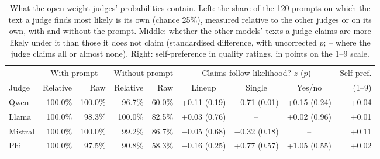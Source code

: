 \begin{table}[t]
\centering\small
\setlength\tabcolsep{4pt}
\begin{adjustbox}{max width=\linewidth}
\begin{tabular}{l rr rr ccc r}
\toprule
 & \multicolumn{2}{c}{With prompt} & \multicolumn{2}{c}{Without prompt} & \multicolumn{3}{c}{Claims follow likelihood? $z$ ($p$)} & Self-pref. \\
\cmidrule(lr){2-3}\cmidrule(lr){4-5}\cmidrule(lr){6-8}
Judge & Relative & Raw & Relative & Raw & Lineup & Single & Yes/no & (1--9) \\
\midrule
Qwen & 100.0\% & 100.0\% & 96.7\% & 60.0\% & +0.11 (0.19) & $-$0.71 (0.01) & +0.15 (0.24) & +0.04 \\
Llama & 100.0\% & 98.3\% & 100.0\% & 82.5\% & +0.03 (0.76) & -- & +0.02 (0.96) & +0.01 \\
Mistral & 100.0\% & 100.0\% & 99.2\% & 86.7\% & $-$0.05 (0.68) & $-$0.32 (0.18) & -- & +0.11 \\
Phi & 100.0\% & 97.5\% & 90.8\% & 58.3\% & $-$0.16 (0.25) & +0.77 (0.57) & +1.05 (0.55) & +0.02 \\
\bottomrule
\end{tabular}
\end{adjustbox}
\caption{What the open-weight judges' probabilities contain. Left: the share of the 120 prompts on which the text a judge finds most likely is its own (chance 25\%), measured relative to the other judges or on its own, with and without the prompt. Middle: whether the other models' texts a judge claims are more likely under it than those it does not claim (standardised difference, with uncorrected $p$; -- where the judge claims all or almost none). Right: self-preference in quality ratings, in points on the 1--9 scale.}
\label{tab:owlik}
\end{table}
